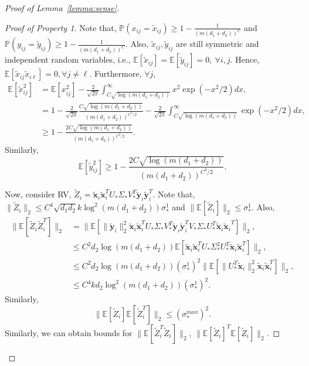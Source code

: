 \documentclass[11pt]{article}
\newcommand{\wt}[1]{\widetilde{#1}}
\newcommand{\tp}[1]{{#1}^{T}}
\newcommand{\E}{\mathbb{E}}
\newcommand{\Vo}{V_*}
\newcommand{\Uot}{\tp{U}_*}
\newcommand{\Vot}{\tp{V}_*}
\newcommand{\So}{\Sigma_*}
\newcommand{\Uo}{U_*}
\newcommand{\so}{\sigma_*}
\newcommand{\x}{\bm{x}}
\newcommand{\y}{\bm{y}}
\begin{document}
\begin{proof}[Proof of Lemma~\ref{lemma:sense}]
\begin{proof}[Proof of Property 1]
Note that, $\mathbb{P}(x_{ij}=\wt{x}_{ij})\geq 1-\frac{1}{(m(d_1+d_2))^C}$ and $\mathbb{P}(y_{ij}=\wt{y}_{ij})\geq 1-\frac{1}{(m(d_1+d_2))^C}$. Also, $\wt{x}_{ij}, \wt{y}_{ij}$ are still symmetric and independent random variables, i.e., $\E[\wt{x}_{ij}]=\E[\wt{y}_{ij}]=0,\ \forall i, j$. Hence, $\E[\wt{x}_{ij}\wt{x}_{i\ell}]=0, \forall j\neq \ell$. Furthermore, $\forall j$, 
\begin{align}
  \E[\wt{x}_{ij}^2]&=\E[x_{ij}^2]-\frac{2}{\sqrt{2\pi}}\int_{C\sqrt{\log(m(d_1+d_2))}}^{\infty} x^2 \exp(-x^2/2)dx, \nonumber\\
&=1-\frac{2}{\sqrt{2\pi}}\frac{C\sqrt{\log(m(d_1+d_2))}}{(m(d_1+d_2))^{C^2/2}}-\frac{2}{\sqrt{2\pi}}\int_{C\sqrt{\log(m(d_1+d_2))}}^{\infty} \exp(-x^2/2)dx, \nonumber\\
&\geq 1-\frac{2C\sqrt{\log(m(d_1+d_2))}}{(m(d_1+d_2))^{C^2/2}}. \label{eq:scx}
\end{align}
Similarly, 
\begin{equation}
  \label{eq:scy}
  \E[\wt{y}_{ij}^2]\geq 1-\frac{2C\sqrt{\log(m(d_1+d_2))}}{(m(d_1+d_2))^{C^2/2}}. 
\end{equation}

Now, consider RV, $\wt{Z}_i=\wt{\x}_i\tp{\wt{\x}}_i \Uo\So\Vot \wt{\y}_i\tp{\wt{\y}}_i.$ Note that, $\|\wt{Z}_i\|_2\leq C^4 \sqrt{d_1d_2}k\log^2(m(d_1+d_2)) \so^1$ and $\|\E[\wt{Z}_i]\|_2\leq \so^1$. Also, 
\begin{align}
  \|\E[\wt{Z}_i\tp{\wt{Z}}_i]\|_2&=\|\E[\|\wt{\y}_i\|_2^2\wt{\x}_i\tp{\wt{\x}}_i \Uo\So\Vot \wt{\y}_i\tp{\wt{\y}}_i\Vo\So\tp{U}_*\wt{\x}_i\tp{\wt{\x}_i}]\|_2,\nonumber\\
&\leq C^2d_2\log(m(d_1+d_2))\E[\wt{\x}_i\tp{\wt{\x}}_i \Uo\So^2\Uot\wt{\x}_i\tp{\wt{\x}}_i]\|_2,\nonumber\\
&\leq C^2d_2\log(m(d_1+d_2))(\so^1)^2\|\E[\|\Uot\wt{\x}_i\|_2^2 \wt{\x}_i\tp{\wt{\x}}_i]\|_2,\nonumber\\
&\leq C^4kd_2\log^2(m(d_1+d_2))(\so^1)^2. 
\end{align}
Similarly, 
\begin{equation}
  \label{eq:expz2}
  \|\E[\wt{Z}_i]\E[\tp{\wt{Z}}_i]\|_2\leq (\sigma_*^{max})^2. 
\end{equation}
Similarly, we can obtain bounds for $\|\E[\tp{\wt{Z}}_i\wt{Z}_i]\|_2$, $\|\tp{\E[\wt{Z}_i]}\E[\wt{Z}_i]\|_2$. 


\end{proof}
\end{proof}
\end{document}
